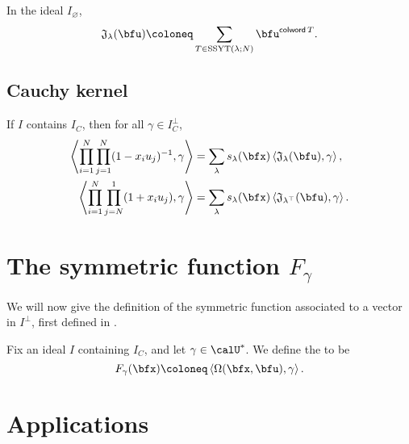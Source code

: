 \documentclass{article}
\newcommand{\ip}[1]{
    \left\langle
        {#1}
    \right\rangle
}
\newcommand*\colword{\operatorname{\mathsf{colword}}}
\newcommand*\frkJ{\mathfrak{J}}
\newcommand*\SSYT{\operatorname{SSYT}}
\begin{document}
\begin{theorem}
    In the ideal $I_\varnothing$,
    \[
        \frkJ_\lambda(\bfu)
        \coloneq
        \sum_{T \in \SSYT(\lambda;N)}
        \bfu^{\colword T}.
    \]
\end{theorem}

\subsection{Cauchy kernel}

\begin{theorem}
    If $I$ contains $I_C$, then for all $\gamma \in I_C^\perp$,
    \begin{align}
        \ip{
            \prod_{i=1}^N
            \prod_{j=1}^N
            (1 - x_iu_j)^{-1},
            \gamma
        }
        &=
        \sum_\lambda
        s_\lambda(\bfx)
        \ip{
        \frkJ_\lambda(\bfu),\gamma
        },
        \\
        \ip{
            \prod_{i=1}^N
            \prod_{j=N}^1
            (1 + x_iu_j),
            \gamma
        }
        &=
        \sum_\lambda
        s_\lambda(\bfx)
        \ip{
        \frkJ_{\lambda^\top}(\bfu),\gamma
        }.
    \end{align}
\end{theorem}


\section{
    The symmetric function $F_\gamma$
}

We will now give the definition of the symmetric function associated to a vector in $I^\perp$, first defined in \cite{FG98}.

\begin{definition}
    Fix an ideal $I$ containing $I_C$, and let $\gamma \in \calU^\ast$.
    We define the  to be
    \[
        F_\gamma(\bfx)
        \coloneq
        \ip{\Omega(\bfx,\bfu),\gamma}.
    \]
\end{definition}

\begin{definition}
\end{definition}

\section{Applications}
\end{document}
